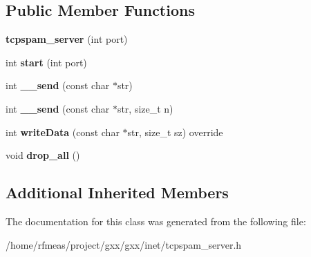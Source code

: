 \subsection*{Public Member Functions}
\begin{DoxyCompactItemize}
\item 
{\bfseries tcpspam\+\_\+server} (int port)\hypertarget{classgxx_1_1inet_1_1tcpspam__server_a947b27f315419d5f96a3af415b220855}{}\label{classgxx_1_1inet_1_1tcpspam__server_a947b27f315419d5f96a3af415b220855}

\item 
int {\bfseries start} (int port)\hypertarget{classgxx_1_1inet_1_1tcpspam__server_abff6e174ec77d5602ac19bcdc6b164b5}{}\label{classgxx_1_1inet_1_1tcpspam__server_abff6e174ec77d5602ac19bcdc6b164b5}

\item 
int {\bfseries \+\_\+\+\_\+send} (const char $\ast$str)\hypertarget{classgxx_1_1inet_1_1tcpspam__server_aec7dbca9186c197d95798764616c956d}{}\label{classgxx_1_1inet_1_1tcpspam__server_aec7dbca9186c197d95798764616c956d}

\item 
int {\bfseries \+\_\+\+\_\+send} (const char $\ast$str, size\+\_\+t n)\hypertarget{classgxx_1_1inet_1_1tcpspam__server_ad2a31b5b9e8db468a4a47e80b61f5a99}{}\label{classgxx_1_1inet_1_1tcpspam__server_ad2a31b5b9e8db468a4a47e80b61f5a99}

\item 
int {\bfseries write\+Data} (const char $\ast$str, size\+\_\+t sz) override\hypertarget{classgxx_1_1inet_1_1tcpspam__server_aedba639ceb39ce81055af2d3df88cd07}{}\label{classgxx_1_1inet_1_1tcpspam__server_aedba639ceb39ce81055af2d3df88cd07}

\item 
void {\bfseries drop\+\_\+all} ()\hypertarget{classgxx_1_1inet_1_1tcpspam__server_a131d8cd08b0e53056218119837b63922}{}\label{classgxx_1_1inet_1_1tcpspam__server_a131d8cd08b0e53056218119837b63922}

\end{DoxyCompactItemize}
\subsection*{Additional Inherited Members}


The documentation for this class was generated from the following file\+:\begin{DoxyCompactItemize}
\item 
/home/rfmeas/project/gxx/gxx/inet/tcpspam\+\_\+server.\+h\end{DoxyCompactItemize}
